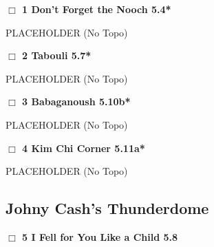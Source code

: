 \begin{multicols}{2}
\needspace{2em}
\label{rt:Don't Forget the Nooch}
\colorbox{green!20}{
\parbox{0.95\linewidth}{
\hspace{-1ex}\textbf{$\Box$
1 Don't Forget the Nooch 5.4*  
}}}
\begin{adjustwidth}{1.3em}{}			

PLACEHOLDER
  (No Topo)
\end{adjustwidth}




\needspace{2em}
\label{rt:Tabouli}
\colorbox{green!20}{
\parbox{0.95\linewidth}{
\hspace{-1ex}\textbf{$\Box$
2 Tabouli 5.7*  
}}}
\begin{adjustwidth}{1.3em}{}			

PLACEHOLDER
  (No Topo)
\end{adjustwidth}




\needspace{2em}
\label{rt:Babaganoush}
\colorbox{RoyalBlue!20}{
\parbox{0.95\linewidth}{
\hspace{-1ex}\textbf{$\Box$
3 Babaganoush 5.10b*  
}}}
\begin{adjustwidth}{1.3em}{}			

PLACEHOLDER
  (No Topo)
\end{adjustwidth}




\needspace{2em}
\label{rt:Kim Chi Corner}
\colorbox{RoyalBlue!20}{
\parbox{0.95\linewidth}{
\hspace{-1ex}\textbf{$\Box$
4 Kim Chi Corner 5.11a*  
}}}
\begin{adjustwidth}{1.3em}{}			

PLACEHOLDER
  (No Topo)
\end{adjustwidth}





\needspace{10em}
\subsection*{Johny Cash's Thunderdome}\label{bf:Johny Cash's Thunderdome}




\needspace{2em}
\label{rt:I Fell for You Like a Child}
\colorbox{green!20}{
\parbox{0.95\linewidth}{
\hspace{-1ex}\textbf{$\Box$
5 I Fell for You Like a Child 5.8  
}}}
\begin{adjustwidth}{1.3em}{}			


\end{adjustwidth}
\end{multicols}
